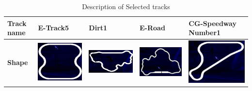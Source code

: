 \documentclass[runningheads,a4paper]{llncs}
\begin{document}
	\begin{table}
		
		\caption{Description of Selected tracks}
		\label{Tabtrack}
		\begin{tabular}{ |p{2cm}|p{1.9 cm}|p{2.2 cm}|p{2.1 cm}|p{2.2 cm}|}
			\hline
			\textbf{Track name}    & E-Track5
			& Dirt1 
			& E-Road
			& CG-Speedway Number1
			\\
			\hline
			\textbf{Shape}   
			& \includegraphics[scale=0.3]{fig/track4.png}
			& \includegraphics[scale=0.3]{fig/track2.png}
			& \includegraphics[scale=0.3]{fig/track5.png}
			& \includegraphics[scale=0.3]{fig/track1.png}
			

\end{tabular}
\end{table}
\end{document}

